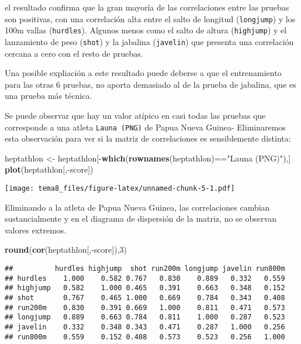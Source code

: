 \documentclass[]{article}
\newenvironment{Shaded}{\begin{snugshade}}{\end{snugshade}}
\newcommand{\KeywordTok}[1]{\textcolor[rgb]{0.13,0.29,0.53}{\textbf{{#1}}}}
\newcommand{\DecValTok}[1]{\textcolor[rgb]{0.00,0.00,0.81}{{#1}}}
\newcommand{\StringTok}[1]{\textcolor[rgb]{0.31,0.60,0.02}{{#1}}}
\newcommand{\NormalTok}[1]{{#1}}
\numberwithin{equation}{section}
\begin{document}
el resultado confirma que la gran mayoría de las correlaciones entre las
pruebas son positivas, con una correlación alta entre el salto de
longitud (\texttt{longjump}) y los 100m vallas (\texttt{hurdles}).
Algunos menos como el salto de altura (\texttt{highjump}) y el
lanzamiento de peso (\texttt{shot}) y la jabalina (\texttt{javelin}) que
presenta una correlación cercana a cero con el resto de pruebas.

Una posible expliación a este resultado puede deberse a que el
entrenamiento para las otras 6 pruebas, no aporta demasiado al de la
prueba de jabalina, que es una prueba más técnica.

Se puede observar que hay un valor atípico en casi todas las pruebas que
corresponde a una atleta \texttt{Launa\ (PNG)} de Papua Nueva Guinea-
Eliminaremos esta observación para ver si la matriz de correlaciones es
sensiblemente distinta:

\begin{Shaded}
\begin{Highlighting}[]
\NormalTok{heptathlon <-}\StringTok{ }\NormalTok{heptathlon[-}\KeywordTok{which}\NormalTok{(}\KeywordTok{rownames}\NormalTok{(heptathlon)==}\StringTok{"Launa (PNG)"}\NormalTok{),]}
\KeywordTok{plot}\NormalTok{(heptathlon[,-score])}
\end{Highlighting}
\end{Shaded}

\texttt{[image: tema8\_files/figure-latex/unnamed-chunk-5-1.pdf]}

Eliminando a la atleta de Papua Nueva Guinea, las correlaciones cambian
sustancialmente y en el diagrama de dispersión de la matriz, no se
observan valores extremos.

\begin{Shaded}
\begin{Highlighting}[]
\KeywordTok{round}\NormalTok{(}\KeywordTok{cor}\NormalTok{(heptathlon[,-score]),}\DecValTok{3}\NormalTok{)}
\end{Highlighting}
\end{Shaded}

\begin{verbatim}
##          hurdles highjump  shot run200m longjump javelin run800m
## hurdles    1.000    0.582 0.767   0.830    0.889   0.332   0.559
## highjump   0.582    1.000 0.465   0.391    0.663   0.348   0.152
## shot       0.767    0.465 1.000   0.669    0.784   0.343   0.408
## run200m    0.830    0.391 0.669   1.000    0.811   0.471   0.573
## longjump   0.889    0.663 0.784   0.811    1.000   0.287   0.523
## javelin    0.332    0.348 0.343   0.471    0.287   1.000   0.256
## run800m    0.559    0.152 0.408   0.573    0.523   0.256   1.000
\end{verbatim}
\end{document}

